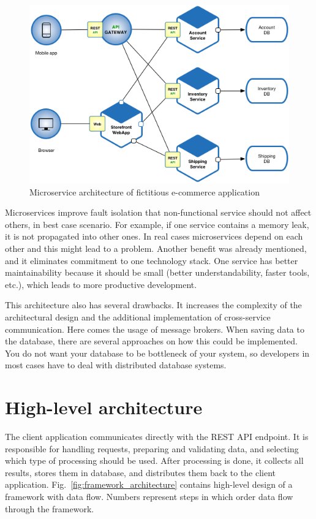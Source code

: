 \begin{figure}[H]
    \centering
    \includegraphics[width=.7\linewidth]{other-fig/microservice_architecture.png}
    \caption{Microservice architecture of fictitious e-commerce application}
    \label{fig:microservice_architecture}
\end{figure}

Microservices improve fault isolation that non-functional service should not affect others, in best case scenario. For example, if one service contains a memory leak, it is not propagated into other ones. In real cases microservices depend on each other and this might lead to a problem. Another benefit was already mentioned, and it eliminates commitment to one technology stack. One service has better maintainability because it should be small (better understandability, faster tools, etc.), which leads to more productive development.

This architecture also has several drawbacks. It increases the complexity of the architectural design and the additional implementation of cross-service communication. Here comes the usage of message brokers. When saving data to the database, there are several approaches on how this could be implemented. You do not want your database to be bottleneck of your system, so developers in most cases have to deal with distributed database systems.~\cite{MicroserviceArchitecture}

\section{High-level architecture}

The client application communicates directly with the REST API endpoint. It is responsible for handling requests, preparing and validating data, and selecting which type of processing should be used. After processing is done, it collects all results, stores them in database, and distributes them back to the client application. Fig.~\ref{fig:framework_architecture} contains high-level design of a framework with data flow. Numbers represent steps in which order data flow through the framework.

